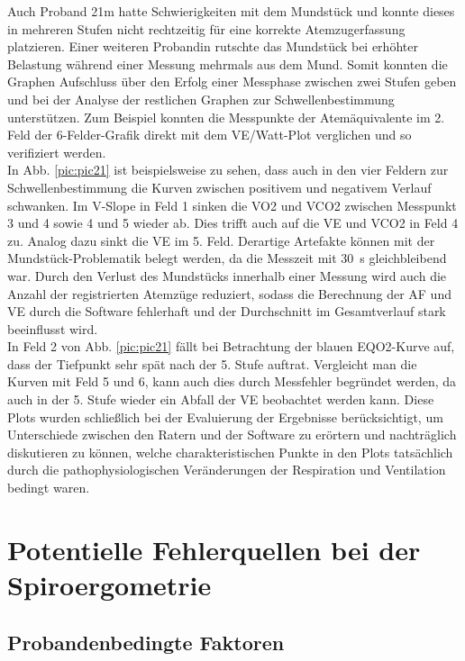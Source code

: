 Auch Proband 21m hatte Schwierigkeiten mit dem Mundstück und konnte dieses in mehreren Stufen nicht rechtzeitig für eine korrekte Atemzugerfassung platzieren. Einer weiteren Probandin rutschte das Mundstück bei erhöhter Belastung während einer Messung mehrmals aus dem Mund. Somit konnten die Graphen Aufschluss über den Erfolg einer Messphase zwischen zwei Stufen geben und bei der Analyse der restlichen Graphen zur Schwellenbestimmung unterstützen. Zum Beispiel konnten die Messpunkte der Atemäquivalente im 2. Feld der 6-Felder-Grafik direkt mit dem \acs{VE}/Watt-Plot verglichen und so verifiziert werden.\\
In Abb. \ref{pic:pic21} ist beispielsweise zu sehen, dass auch in den vier Feldern zur Schwellenbestimmung die Kurven zwischen positivem und negativem Verlauf schwanken. Im V-Slope in Feld 1 sinken die \acs{VO2} und \acs{VCO2} zwischen Messpunkt 3 und 4 sowie 4 und 5 wieder ab. Dies trifft auch auf die \acs{VE} und \acs{VCO2} in Feld 4 zu. Analog dazu sinkt die \acs{VE} im 5. Feld. Derartige Artefakte können mit der Mundstück-Problematik belegt werden, da die Messzeit mit \SI{30}{\second} gleichbleibend war. Durch den Verlust des Mundstücks innerhalb einer Messung wird auch die Anzahl der registrierten Atemzüge reduziert, sodass die Berechnung der \acs{AF} und \acs{VE} durch die Software fehlerhaft und der Durchschnitt im Gesamtverlauf stark beeinflusst wird.\\
In Feld 2 von Abb. \ref{pic:pic21} fällt bei Betrachtung der blauen \acs{EQO2}-Kurve auf, dass der Tiefpunkt sehr spät nach der 5. Stufe auftrat. Vergleicht man die Kurven mit Feld 5 und 6, kann auch dies durch Messfehler begründet werden, da auch in der 5. Stufe wieder ein Abfall der \acs{VE} beobachtet werden kann. Diese Plots wurden schließlich bei der Evaluierung der Ergebnisse berücksichtigt, um Unterschiede zwischen den Ratern und der Software zu erörtern und nachträglich diskutieren zu können, welche charakteristischen Punkte in den Plots tatsächlich durch die pathophysiologischen Veränderungen der Respiration und Ventilation bedingt waren.

\section{Potentielle Fehlerquellen bei der Spiroergometrie}

\subsection{Probandenbedingte Faktoren}

